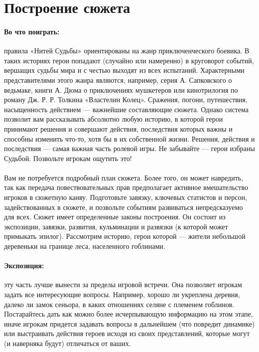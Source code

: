 \section{Построение сюжета}
\paragraph{Во что поиграть:} правила «Нитей Судьбы» ориентированы на жанр приключенческого боевика. В таких историях герои попадают (случайно или намеренно) в круговорот событий, вершащих судьбы мира и с честью выходят из всех испытаний. Характерными представителями этого жанра являются, например, серия А. Сапковского о ведьмаке, книги А. Дюма о приключениях мушкетеров или кинотрилогия по роману Дж. Р. Р. Толкина «Властелин Колец». Сражения, погони, путешествия, насыщенность действием — важнейшие составляющие сюжета. Однако система позволит вам рассказывать абсолютно любую историю, в которой герои принимают решения и совершают действия, последствия которых важны и способны изменить что-то, хотя бы в их собственной жизни. Решения, действия и последствия — самая важная часть ролевой игры. Не забывайте — герои избраны Судьбой. Позвольте игрокам ощутить это!
\paragraph{}
Вам не потребуется подробный план сюжета. Более того, он может навредить, так как передача повествовательных прав предполагает активное вмешательство игроков в сюжетную канву. Подготовьте завязку, ключевых статистов и персон, задействованных в сюжете, и позвольте событиям развиваться непредсказуемо для всех. Сюжет имеет определенные законы построения. Он состоит из экспозиции, завязки, развития, кульминации и развязки (к которой может примыкать эпилог). Рассмотрим историю, герои которой — жители небольшой деревеньки на границе леса, населенного гоблинами.
\paragraph{Экспозиция:} эту часть лучше вынести за пределы игровой встречи. Она позволяет игрокам задать все интересующие вопросы. Например, хорошо ли укреплена деревня, далеко ли замок сеньора, в каких отношениях селяне с племенем гоблинов. Постарайтесь дать как можно более исчерпывающую информацию на этом этапе, иначе игрокам придется задавать вопросы в дальнейшем (что повредит динамике) или выстраивать действия героев исходя из своих представлений, которые могут (и наверняка будут) отличаться от ваших.
